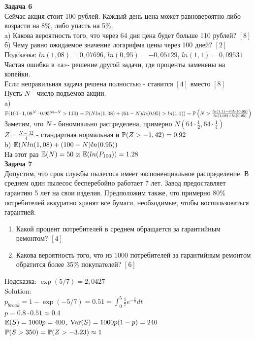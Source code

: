 \documentclass[12pt, a4paper]{article}\usepackage[]{graphicx}\usepackage[]{color}
\begin{document}
	\textbf{Задача 6} \\ %
	Сейчас акция стоит 100 рублей. Каждый день цена может равновероятно либо возрасти на 8\%, либо упасть на 5\%. \\
	a) Какова вероятность того, что через 64 дня цена будет больше 110 рублей? $[8]$ \\
	б) Чему равно ожидаемое значение логарифма цены через 100 дней? $[2]$ \\
	Подсказка: $ln(1,08)=0,07696$, $ln(0,95)=-0,05129$, $ln(1,1)=0,09531$ \\
	Частая ошибка в «а»- решение другой задачи, где проценты заменены на копейки. \\
	Если неправильная задача решена полностью - ставится $[4]$ вместо $[8]$ \\
	Пусть $N$ - число подъемов акции. \\
	a) $\P(100\cdot 1,08^N\cdot 0.95^{64-N}>110)=\\
	\P(Nln(1,08)+(64-N)ln(0.95)>ln(1.1))=\\
	\P\left(N>\frac{ln(1,1)-64ln(0,95)}{ln(1,08)-ln(0.95)}\right)$\\
	Заметим, что $N$ - биномиально распределена, примерно $N(64\cdot\frac{1}{2},64\cdot\frac{1}{4})$\\
	$Z=\frac{N-32}{4}$ - стандартная нормальная и $\P(Z>-1,42)=0.92$ \\
	b) $\E(Nln(1,08)+(100-N)ln(0.95))$ \\
	На этот раз $\E(N)=50$ и $\E(ln(P_{100}))=1.28$ \\



	\textbf{Задача 7} \\
	Допустим, что срок службы пылесоса имеет экспоненциальное распределение. В среднем один пылесос бесперебойно работает 7 лет. Завод предоставляет гарантию 5 лет на свои изделия. Предположим также, что примерно 80\% потребителей аккуратно хранят все бумаги, необходимые, чтобы воспользоваться гарантией.
	\begin{enumerate}
		\item Какой процент потребителей в среднем обращается за гарантийным ремонтом? $[4]$ \\
		\item Какова вероятность того, что из 1000 потребителей за гарантийным ремонтом обратится более 35\% покупателей? $[6]$ \\
	\end{enumerate}
	Подсказка: $\exp(5/7)=2,0427$ \\
	Solution: \\
	$p_{break}=1-\exp(-5/7)=0.51=\int_{0}^{5}\frac{1}{7}e^{-\frac{t}{7}}dt$ \\
	$p=0.8\cdot 0.51\approx 0.4$ \\
	$\E(S)=1000p=400$, $\Var(S)=1000p(1-p)=240$ \\
	$\P(S>350)=\P(Z>-3.23)\approx 1$ \\
\end{document}
